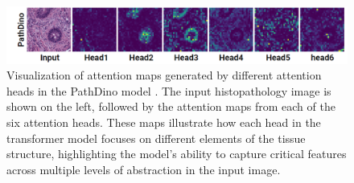\documentclass[peerreview]{IEEEtran}
\begin{document}
\begin{figure}
\centering
\includegraphics[width=\columnwidth]{figure/attention_pathdino.png} 
\caption[Pathdino Attention Layers Visualization.]{\small Visualization of attention maps generated by different attention heads in the PathDino model \cite{b5}. The input histopathology image is shown on the left, followed by the attention maps from each of the six attention heads. These maps illustrate how each head in the transformer model focuses on different elements of the tissue structure, highlighting the model's ability to capture critical features across multiple levels of abstraction in the input image.} 

\label{fig:attention_pathdino}
\end{figure}
\end{document}
